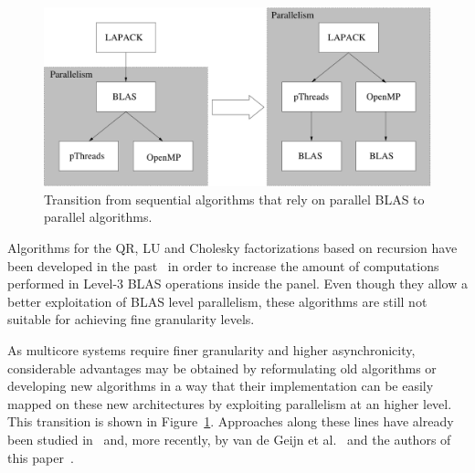 \documentclass{article}
\begin{document}
\begin{figure}[!h]
  \begin{center}
    \includegraphics[width=\textwidth]{images/par_algos}
  \caption{\label{fig:par_algos}Transition from sequential algorithms
    that rely on parallel BLAS to parallel algorithms.}
  \end{center}
\end{figure}

Algorithms for the QR, LU and Cholesky factorizations based on
recursion have been developed in the past~\cite{kag-gus,279535} in
order to increase the amount of computations performed in Level-3 BLAS
operations inside the panel. Even though they allow a better
exploitation of BLAS level parallelism, these algorithms are still not
suitable for achieving fine granularity levels.
 
As multicore systems require finer granularity and higher
asynchronicity, considerable advantages may be obtained by
reformulating old algorithms or developing new algorithms in a way
that their implementation can be easily mapped on these new
architectures by exploiting parallelism at an higher level. This
transition is shown in Figure~\ref{fig:par_algos}. Approaches along
these lines have already been studied in~\cite{76287,essl01} and, more
recently, by van de Geijn et al.~\cite{vdgqr,1248397} and the authors
of this paper~\cite{Kurzak:2006:ILA,para06,1248397, cell_chol}.
\end{document}
